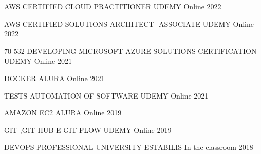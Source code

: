 

\begin{cvhonors}

  \cvhonor
    {AWS CERTIFIED CLOUD PRACTITIONER} %
    {UDEMY} %
    {Online} %
    {2022} %

  \cvhonor
    {AWS CERTIFIED SOLUTIONS ARCHITECT- ASSOCIATE} %
    {UDEMY} %
    {Online} %
    {2022} %

  \cvhonor
    {70-532 DEVELOPING MICROSOFT AZURE SOLUTIONS CERTIFICATION} %
    {UDEMY} %
    {Online} %
    {2021} %

  \cvhonor
    {DOCKER} %
    {ALURA} %
    {Online} %
    {2021} %

  \cvhonor
    {TESTS AUTOMATION OF SOFTWARE} %
    {UDEMY} %
    {Online} %
    {2021} %

  \cvhonor
    {AMAZON EC2} %
    {ALURA} %
    {Online} %
    {2019} %

  \cvhonor
    {GIT ,GIT HUB E GIT FLOW} %
    {UDEMY} %
    {Online} %
    {2019} %

  \cvhonor
    {DEVOPS PROFESSIONAL} %
    {UNIVERSITY ESTABILIS} %
    {In the classroom} %
    {2018} %


\end{cvhonors}
